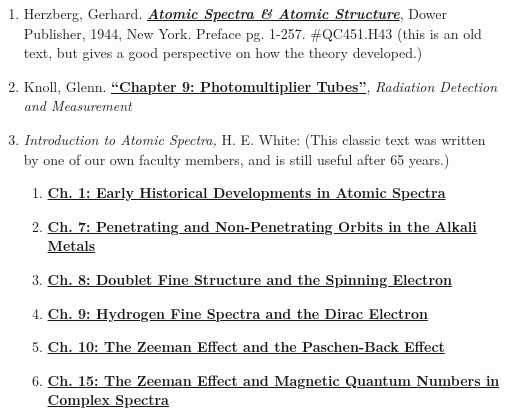 \documentclass{../lab}
\begin{document}
\begin{enumerate}
    \item Herzberg, Gerhard. \emph{\href{https://drive.google.com/file/d/1WSyJRwUKQZkj335oLa1WTh3_NwQC4f2T/view?usp=drive_link}{\textbf{Atomic Spectra \& Atomic Structure}}}, Dower Publisher, 1944, New York. Preface pg. 1-257. \#QC451.H43 (this is an old text, but gives a good perspective on how the theory developed.)
    
    \item Knoll, Glenn. \href{https://drive.google.com/file/d/1SoVP6jmWYZIQK9NuvwGr-_TFffYuJ3Q4/view?usp=drive_link}{\textbf{``Chapter 9: Photomultiplier Tubes''}}, \emph{Radiation Detection and Measurement}

    \item \emph{Introduction to Atomic Spectra,} H. E. White: (This classic text was written by one of our own faculty members, and is still useful after 65 years.)
    \begin{enumerate}
        
        \item \href{https://drive.google.com/file/d/1oiw0_FbAHmh3V0uUix_nuOUBMRa5b-XH/view?usp=drive_link}{\textbf{Ch. 1: Early Historical Developments in Atomic Spectra}}
    
        \item \href{https://drive.google.com/file/d/1bDpA4Dwnw-ity-xMIKWdujgmafweGknd/view?usp=drive_link}{\textbf{Ch. 7: Penetrating and Non-Penetrating Orbits in the Alkali Metals}}
        
        \item \href{https://drive.google.com/file/d/1ueeMbqDiWZvp_b85L_2a9a_38ViVj7Tl/view?usp=drive_link}{\textbf{Ch. 8: Doublet Fine Structure and the Spinning Electron}}
        
        \item \href{https://drive.google.com/file/d/1tjVR33gXo5kfVpSluOBYrsRSRBFBhb94/view?usp=drive_link}{\textbf{Ch. 9: Hydrogen Fine Spectra and the Dirac Electron}}
        
        \item \href{https://drive.google.com/file/d/1yO4sSsAXd8b1ka7gvY3PEDyT7o734Qb6/view?usp=drive_link}{\textbf{Ch. 10: The Zeeman Effect and the Paschen-Back Effect}}
        
        \item \href{https://drive.google.com/file/d/163V9J3sAnsG-pTRLnOi8di4tekaFrsjl/view?usp=drive_link}{\textbf{Ch. 15: The Zeeman Effect and Magnetic Quantum Numbers in Complex Spectra}}
        

\end{enumerate}
\end{enumerate}
\end{document}
